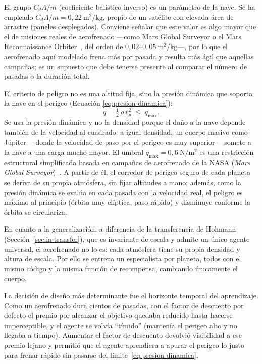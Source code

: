 El grupo $C_d A/m$ (coeficiente balístico inverso) es un parámetro de la nave. Se ha empleado $C_d A/m = 0{,}22\ \mathrm{m^2/kg}$, propio de un satélite con elevada área de arrastre (paneles desplegados). Conviene señalar que este valor es algo mayor que el de misiones reales de aerofrenado ---como Mars Global Surveyor o el Mars Reconnaissance Orbiter~\cite{mroAerobraking}, del orden de $0{,}02$--$0{,}05\ \mathrm{m^2/kg}$---, por lo que el aerofrenado aquí modelado frena más por pasada y resulta más ágil que aquellas campañas; es un supuesto que debe tenerse presente al comparar el número de pasadas o la duración total.

El criterio de peligro no es una altitud fija, sino la presión dinámica que soporta la nave en el perigeo (Ecuación \ref{eq:presion-dinamica}):
\begin{equation}
  q = \tfrac{1}{2}\,\rho\,v_p^{2} \;\le\; q_{\max}.
  \label{eq:presion-dinamica}
\end{equation}
Se usa la presión dinámica y no la densidad porque el daño a la nave depende también de la velocidad al cuadrado: a igual densidad, un cuerpo masivo como Júpiter ---donde la velocidad de paso por el perigeo es muy superior--- somete a la nave a una carga mucho mayor. El umbral $q_{\max}=0{,}6\ \mathrm{N/m^2}$ es una restricción estructural simplificada basada en campañas de aerofrenado de la \gls{NASA} (\textit{Mars Global Surveyor})~\cite{mgsMissionPlan}. A partir de él, el corredor de perigeo seguro de cada planeta se deriva de su propia atmósfera, sin fijar altitudes a mano; además, como la presión dinámica se evalúa en cada pasada con la velocidad real, el peligro es máximo al principio (órbita muy elíptica, paso rápido) y disminuye conforme la órbita se circulariza.

En cuanto a la generalización, a diferencia de la transferencia de Hohmann (Sección~\ref{sec:ia-transfer}), que es invariante de escala y admite un único agente universal, el aerofrenado no lo es: cada atmósfera tiene su propia densidad y altura de escala. Por ello se entrena un especialista por planeta, todos con el mismo código y la misma función de recompensa, cambiando únicamente el cuerpo.

La decisión de diseño más determinante fue el horizonte temporal del aprendizaje. Como un aerofrenado dura cientos de pasadas, con el factor de descuento por defecto el premio por alcanzar el objetivo quedaba reducido hasta hacerse imperceptible, y el agente se volvía ``tímido'' (mantenía el perigeo alto y no llegaba a tiempo). Aumentar el factor de descuento devolvió visibilidad a ese premio lejano y permitió que el agente aprendiera a apurar el perigeo lo justo para frenar rápido sin pasarse del límite~\eqref{eq:presion-dinamica}.

